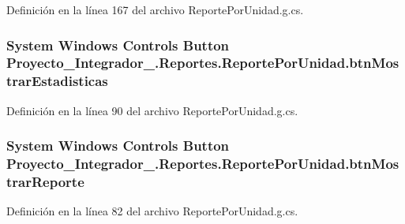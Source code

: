 Definición en la línea 167 del archivo Reporte\-Por\-Unidad.\-g.\-cs.

\hypertarget{class_proyecto___integrador__3_1_1_reportes_1_1_reporte_por_unidad_a94105030b4216f4d35e4e26fe90de49e}{
\subsubsection[{btn\-Mostrar\-Estadisticas}]{\setlength{\rightskip}{0pt plus 5cm}System Windows Controls Button Proyecto\-\_\-\-Integrador\-\_.\-Reportes.\-Reporte\-Por\-Unidad.\-btn\-Mostrar\-Estadisticas\hspace{0.3cm}{\ttfamily [package]}}}\label{class_proyecto___integrador__3_1_1_reportes_1_1_reporte_por_unidad_a94105030b4216f4d35e4e26fe90de49e}


Definición en la línea 90 del archivo Reporte\-Por\-Unidad.\-g.\-cs.

\hypertarget{class_proyecto___integrador__3_1_1_reportes_1_1_reporte_por_unidad_ad0b9b983d747f48216a4fb116f80a3d6}{
\subsubsection[{btn\-Mostrar\-Reporte}]{\setlength{\rightskip}{0pt plus 5cm}System Windows Controls Button Proyecto\-\_\-\-Integrador\-\_.\-Reportes.\-Reporte\-Por\-Unidad.\-btn\-Mostrar\-Reporte\hspace{0.3cm}{\ttfamily [package]}}}\label{class_proyecto___integrador__3_1_1_reportes_1_1_reporte_por_unidad_ad0b9b983d747f48216a4fb116f80a3d6}


Definición en la línea 82 del archivo Reporte\-Por\-Unidad.\-g.\-cs.

